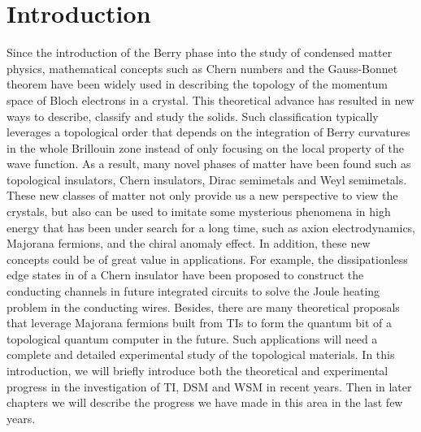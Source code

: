 \chapter{Introduction\label{ch:intro}}

Since the introduction of the Berry phase into the study of condensed matter physics, mathematical concepts such as Chern numbers and the Gauss-Bonnet theorem have been widely used in describing the topology of the momentum space of Bloch electrons in a crystal. This theoretical advance has resulted in new ways to describe, classify and study the solids. Such classification typically leverages a topological order that depends on the integration of Berry curvatures in the whole Brillouin zone instead of only focusing on the local property of the wave function. As a result, many novel phases of matter have been found such as topological insulators, Chern insulators, Dirac semimetals and Weyl semimetals. These new classes of matter not only provide us a new perspective to view the crystals, but also can be used to imitate some mysterious phenomena in high energy that has been under search for a long time, such as axion electrodynamics, Majorana fermions, and the chiral anomaly effect. In addition, these new concepts could be of great value in applications. For example, the dissipationless edge states in of a Chern insulator have been proposed to construct the conducting channels in future integrated circuits to solve the Joule heating problem in the conducting wires. Besides, there are many theoretical proposals that leverage Majorana fermions built from TIs to form the quantum bit of a topological quantum computer in the future. Such applications will need a complete and detailed experimental study of the topological materials. In this introduction, we will briefly introduce both the theoretical and experimental progress in the investigation of TI, DSM and WSM in recent years. Then in later chapters we will describe the progress we have made in this area in the last few years.



